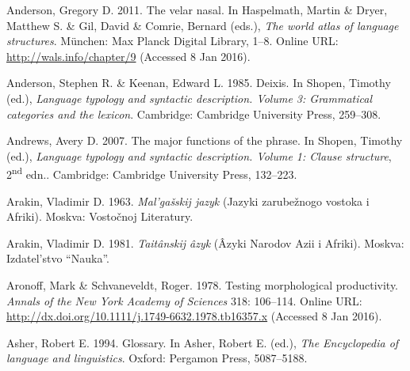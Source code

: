 \begin{styleCitaviBibliographyEntry}
Anderson, Gregory D. 2011. The velar nasal. In Haspelmath, Martin \& Dryer, Matthew S. \& Gil, David \& Comrie, Bernard (eds.), \textit{The world atlas of language structures}. München: Max Planck Digital Library, 1–8. Online URL: \url{http://wals.info/chapter/9} (Accessed 8 Jan 2016).
\end{styleCitaviBibliographyEntry}

\begin{styleCitaviBibliographyEntry}
Anderson, Stephen R. \& Keenan, Edward L. 1985. Deixis. In Shopen, Timothy (ed.), \textit{Language typology and syntactic description. Volume 3: Grammatical categories and the lexicon}. Cambridge: Cambridge University Press, 259–308.
\end{styleCitaviBibliographyEntry}

\begin{styleCitaviBibliographyEntry}
Andrews, Avery D. 2007. The major functions of the  phrase. In Shopen, Timothy (ed.), \textit{Language typology and syntactic description. Volume 1: Clause structure}, 2\textsuperscript{nd} edn.. Cambridge: Cambridge University Press, 132–223.
\end{styleCitaviBibliographyEntry}

\begin{styleCitaviBibliographyEntry}
Arakin, Vladimir D. 1963. \textit{Mal’ga\v{s}skij jazyk} (Jazyki zarube\v{z}nogo vostoka i Afriki). Moskva: Vosto\v{c}noj Literatury.
\end{styleCitaviBibliographyEntry}

\begin{styleCitaviBibliographyEntry}
Arakin, Vladimir D. 1981. \textit{Taitânskij âzyk} (\^{A}zyki Narodov Azii i Afriki). Moskva: Izdatel’stvo “Nauka”.
\end{styleCitaviBibliographyEntry}

\begin{styleCitaviBibliographyEntry}
Aronoff, Mark \& Schvaneveldt, Roger. 1978. Testing morphological productivity. \textit{Annals of the New York Academy of Sciences} 318: 106–114. Online URL: \url{http://dx.doi.org/10.1111/j.1749-6632.1978.tb16357.x} (Accessed 8 Jan 2016).
\end{styleCitaviBibliographyEntry}

\begin{styleCitaviBibliographyEntry}
Asher, Robert E. 1994. Glossary. In Asher, Robert E. (ed.), \textit{The Encyclopedia of language and linguistics}. Oxford: Pergamon Press, 5087–5188.
\end{styleCitaviBibliographyEntry}

